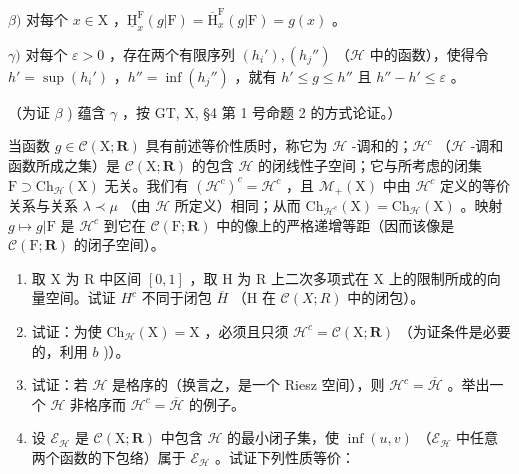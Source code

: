 \(\beta)\) 对每个 \(x \in \mathrm{X}\) ，\(\underline{\mathrm{H}}_x^{\mathrm{F}}(g|\mathrm{F}) = \overline{\mathrm{H}}_x^{\mathrm{F}}(g|\mathrm{F}) = g(x)\) 。

\(\gamma)\) 对每个 \(\varepsilon > 0\) ，存在两个有限序列 \((h_i'), (h_j'')\) （\(\mathcal{H}\) 中的函数），使得令 \(h' = \sup(h_i')\) ，\(h'' = \inf(h_j'')\) ，就有 \(h' \leqslant g \leqslant h''\) 且 \(h'' - h' \leqslant \varepsilon\) 。

（为证 \(\beta\) ) 蕴含 \(\gamma\) ，按 GT, X, §4 第 1 号命题 2 的方式论证。）

当函数 \(g \in \mathcal{C}(\mathrm{X};\mathbf{R})\) 具有前述等价性质时，称它为 \(\mathcal{H}\) -调和的；\(\mathcal{H}^c\) （\(\mathcal{H}\) -调和函数所成之集）是 \(\mathcal{C}(\mathrm{X};\mathbf{R})\) 的包含 \(\mathcal{H}\) 的闭线性子空间；它与所考虑的闭集 \(\mathrm{F} \supset \mathrm{Ch}_{\mathcal{H}}(\mathrm{X})\) 无关。我们有 \((\mathcal{H}^c)^c = \mathcal{H}^c\) ，且 \(\mathcal{M}_+(\mathrm{X})\) 中由 \(\mathcal{H}^c\) 定义的等价关系与关系 \(\lambda \prec \mu\) （由 \(\mathcal{H}\) 所定义）相同；从而 \(\mathrm{Ch}_{\mathcal{H}^c}(\mathrm{X}) = \mathrm{Ch}_{\mathcal{H}}(\mathrm{X})\) 。映射 \(g \mapsto g|\mathrm{F}\) 是 \(\mathcal{H}^c\) 到它在 \(\mathcal{C}(\mathrm{F};\mathbf{R})\) 中的像上的严格递增等距（因而该像是 \(\mathcal{C}(\mathrm{F};\mathbf{R})\) 的闭子空间）。

\begin{enumerate}
\def\labelenumi{\alph{enumi})}
\setcounter{enumi}{3}
\item
  取 X 为 R 中区间 \([0,1]\) ，取 H 为 R 上二次多项式在 X 上的限制所成的向量空间。试证 \(H^{c}\) 不同于闭包 \(\overline{H}\) （H 在 \(\mathcal{C}(X;R)\) 中的闭包）。
\item
  试证：为使 \(\mathrm{Ch}_{\mathcal{H}}(\mathrm{X}) = \mathrm{X}\) ，必须且只须 \(\mathcal{H}^c = \mathcal{C}(\mathrm{X};\mathbf{R})\) （为证条件是必要的，利用 \(b\) )）。
\item
  试证：若 \(\mathcal{H}\) 是格序的（换言之，是一个 Riesz 空间），则 \(\mathcal{H}^c = \overline{\mathcal{H}}\) 。举出一个 \(\mathcal{H}\) 非格序而 \(\mathcal{H}^c = \overline{\mathcal{H}}\) 的例子。
\item
  设 \(\mathcal{E}_{\mathcal{H}}\) 是 \(\mathcal{C}(\mathrm{X};\mathbf{R})\) 中包含 \(\mathcal{H}\) 的最小闭子集，使 \(\inf (u,v)\) （\(\mathcal{E}_{\mathcal{H}}\) 中任意两个函数的下包络）属于 \(\mathcal{E}_{\mathcal{H}}\) 。试证下列性质等价：
\end{enumerate}

